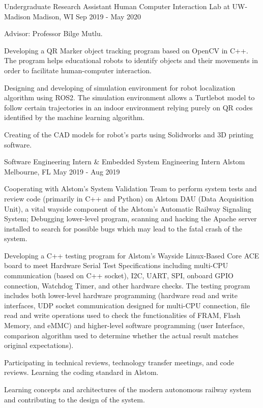 \begin{cventries}

  \cventry
	{Undergraduate Research Assistant} %
	{Human Computer Interaction Lab at UW-Madison} %
	{Madison, WI} %
	{Sep 2019 - May 2020} %
	{
	  \begin{cvitems} %
		\item {Advisor: Professor Bilge Mutlu.}
		\item {Developing a QR Marker object tracking program based on OpenCV in C++. The program helps educational robots to identify objects and their movements in order to facilitate human-computer interaction.}
		\item {Designing and developing of simulation environment for robot localization algorithm using ROS2. The simulation environment allows a Turtlebot model to follow certain trajectories in an indoor environment relying purely on QR codes identified by the machine learning algorithm.}
		\item {Creating of the CAD models for robot's parts  using Solidworks and 3D printing software.}
	  \end{cvitems}
}


  \cventry
    {Software Engineering Intern \& Embedded System Engineering Intern} %
    {Alstom} %
    {Melbourne, FL} %
    {May 2019 - Aug 2019} %
    {
      \begin{cvitems} %
        \item {Cooperating with Alstom's System Validation Team to perform system tests and review code (primarily in C++ and Python) on Alstom DAU (Data Acquisition Unit), a vital wayside component of the Alstom's Automatic Railway Signaling System; Debugging lower-level program, scanning and hacking the Apache server installed to search for possible bugs which may lead to the fatal crash of the system.}
        \item {Developing a C++ testing program for Alstom's Wayside Linux-Based Core ACE board to meet Hardware Serial Test Specifications including multi-CPU communication (based on C++ socket), I2C, UART, SPI, onboard GPIO connection, Watchdog Timer, and other hardware checks. The testing program includes both lower-level hardware programming (hardware read and write interfaces, UDP socket communication designed for multi-CPU connection, file read and write operations used to check the functionalities of FRAM, Flash Memory, and eMMC) and higher-level software programming (user Interface, comparison algorithm used to determine whether the actual result matches original expectations).}
        \item {Participating in technical reviews, technology transfer meetings, and code reviews. Learning the coding standard in Alstom.}
        \item {Learning concepts and architectures of the modern autonomous railway system and contributing to the design of the system.}
      \end{cvitems}
    }

\end{cventries}
